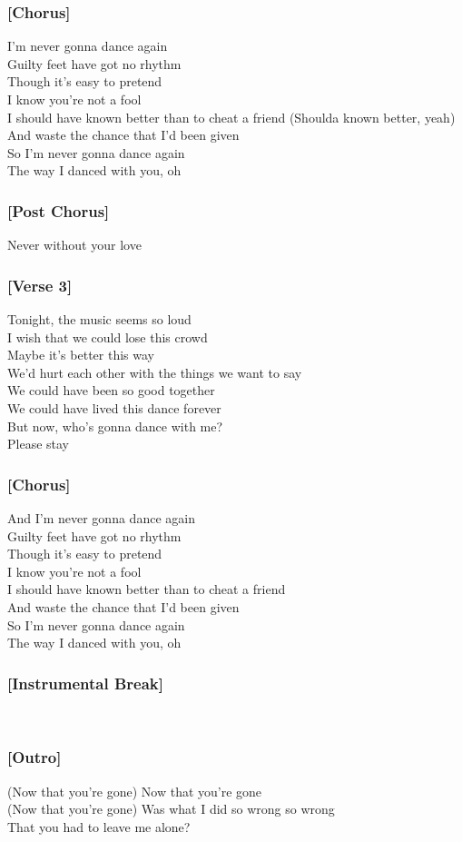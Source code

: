\documentclass[11pt]{article}
\begin{document}
\subsubsection*{[Chorus]}
I'm never gonna dance again \\[4pt]
Guilty feet have got no rhythm \\[4pt]
Though it's easy to pretend \\[4pt]
I know you're not a fool \\[4pt]
I should have known better than to cheat a friend (Shoulda known better, yeah) \\[4pt]
And waste the chance that I'd been given \\[4pt]
So I'm never gonna dance again \\[4pt]
The way I danced with you, oh \\[4pt]

\subsubsection*{[Post Chorus]}
Never without your love \\[4pt]

\subsubsection*{[Verse 3]}
Tonight, the music seems so loud \\[4pt]
I wish that we could lose this crowd \\[4pt]
Maybe it's better this way \\[4pt]
We'd hurt each other with the things we want to say \\[4pt]
We could have been so good together \\[4pt]
We could have lived this dance forever \\[4pt]
But now, who's gonna dance with me? \\[4pt]
Please stay \\[4pt]

\subsubsection*{[Chorus]}
And I'm never gonna dance again \\[4pt]
Guilty feet have got no rhythm \\[4pt]
Though it's easy to pretend \\[4pt]
I know you're not a fool \\[4pt]
I should have known better than to cheat a friend \\[4pt]
And waste the chance that I'd been given \\[4pt]
So I'm never gonna dance again \\[4pt]
The way I danced with you, oh \\[4pt]

\subsubsection*{[Instrumental Break]} \,

\subsubsection*{[Outro]}
(Now that you're gone) Now that you're gone \\[4pt]
(Now that you're gone) Was what I did so wrong so wrong \\[4pt]
That you had to leave me alone? \\[4pt]
\end{document}
